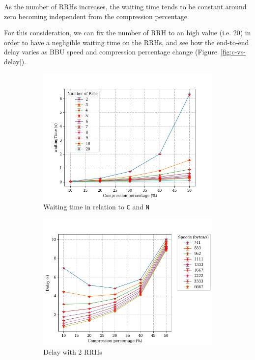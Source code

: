 \documentclass[11pt,a4paper,oneside, openright]{article}
\begin{document}
As the number of RRHs increases, the waiting time tends to be constant around zero becoming independent from the compression percentage. 

For this consideration, we can fix the number of RRH to an high value (i.e. 20) in order to have a negligible waiting time on the RRHs, and see how the end-to-end delay varies as BBU speed and compression percentage change (Figure~\ref{fig:c-vs-delay}).

\begin{figure}[b]
\centering
\begin{subfigure}{.5\textwidth}
  \centering
  \includegraphics[width=\linewidth]{images/c-vs-waiting-from-2}
  \caption{Waiting time in relation to \texttt{C} and \texttt{N}}
  \label{fig:c-vs-waiting-2}
\end{subfigure}%
\begin{subfigure}{.5\textwidth}
  \centering
  \includegraphics[width=\linewidth]{images/worst-case}
  \caption{Delay with 2 RRHs}
  \label{fig:worst-case}
\end{subfigure}
\caption{}
\label{fig:waiting-and-delay-2}
\end{figure}
\end{document}
